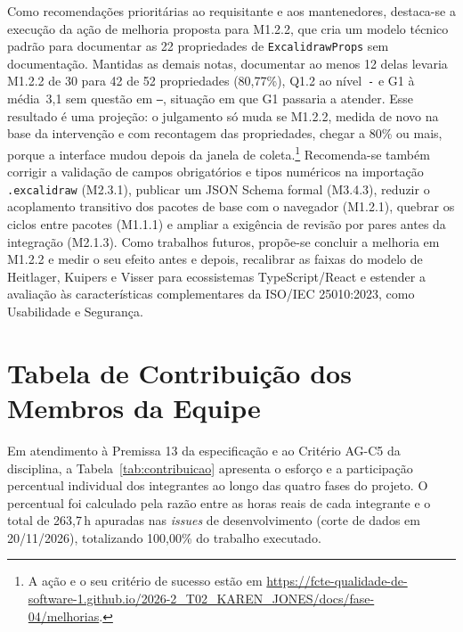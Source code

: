 \documentclass[12pt]{article}
\begin{document}
Como recomendações prioritárias ao requisitante e aos mantenedores, destaca-se a execução da ação de melhoria proposta para M1.2.2, que cria um modelo técnico padrão para documentar as 22 propriedades de \texttt{ExcalidrawProps} sem documentação. Mantidas as demais notas, documentar ao menos 12 delas levaria M1.2.2 de 30 para 42 de 52 propriedades (80,77\%), Q1.2 ao nível~\texttt{-} e G1 à média~3,1 sem questão em \texttt{--}, situação em que G1 passaria a atender. Esse resultado é uma projeção: o julgamento só muda se M1.2.2, medida de novo na base da intervenção e com recontagem das propriedades, chegar a 80\% ou mais, porque a interface mudou depois da janela de coleta.\footnote{A ação e o seu critério de sucesso estão em \url{https://fcte-qualidade-de-software-1.github.io/2026-2_T02_KAREN_JONES/docs/fase-04/melhorias}.} Recomenda-se também corrigir a validação de campos obrigatórios e tipos numéricos na importação \texttt{.excalidraw} (M2.3.1), publicar um JSON Schema formal (M3.4.3), reduzir o acoplamento transitivo dos pacotes de base com o navegador (M1.2.1), quebrar os ciclos entre pacotes (M1.1.1) e ampliar a exigência de revisão por pares antes da integração (M2.1.3). Como trabalhos futuros, propõe-se concluir a melhoria em M1.2.2 e medir o seu efeito antes e depois, recalibrar as faixas do modelo de Heitlager, Kuipers e Visser \cite{heitlager2007} para ecossistemas TypeScript/React e estender a avaliação às características complementares da ISO/IEC 25010:2023, como Usabilidade e Segurança.




\clearpage
\appendix
\section{Tabela de Contribuição dos Membros da Equipe}
Em atendimento à Premissa 13 da especificação e ao Critério AG-C5 da disciplina, a Tabela~\ref{tab:contribuicao} apresenta o esforço e a participação percentual individual dos integrantes ao longo das quatro fases do projeto. O percentual foi calculado pela razão entre as horas reais de cada integrante e o total de 263,7\,h apuradas nas \textit{issues} de desenvolvimento (corte de dados em 20/11/2026), totalizando 100,00\% do trabalho executado.
\end{document}

